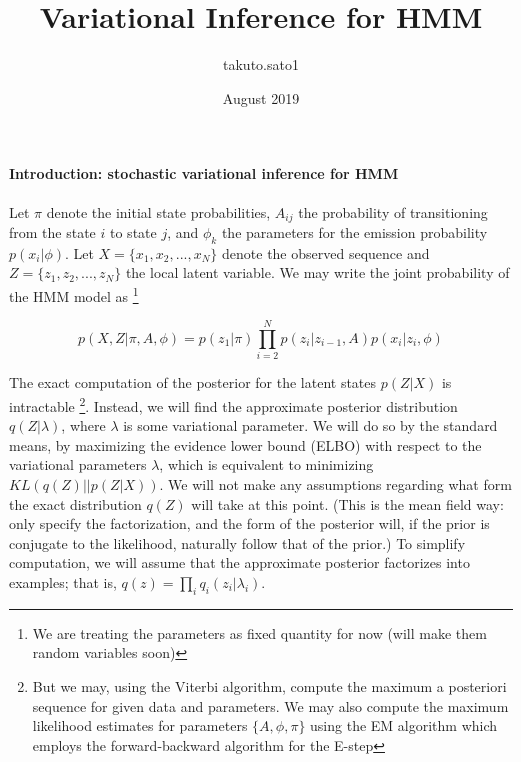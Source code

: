 \documentclass{article}
\title{Variational Inference for HMM}
\author{takuto.sato1 }
\date{August 2019}
\begin{document}
\maketitle

\paragraph{Introduction: stochastic variational inference for HMM}

Let $\pi$ denote the initial state probabilities, $A_{ij}$ the probability of transitioning from the state $i$ to state $j$, and $\phi_k$ the parameters for the emission probability $p(x_i|\phi)$. Let $X = \{x_1, x_2, ..., x_N \}$ denote the observed sequence and $Z = \{ z_1, z_2, ..., z_N \}$ the local latent variable. We may write the joint probability of the HMM model as
\footnote{We are treating the parameters as fixed quantity for now (will make them random variables soon)}

\begin{equation}
p(X,Z|\pi, A, \phi) = p(z_1 | \pi) \prod^N_{i = 2} p(z_i|z_{i-1}, A) p(x_i|z_i, \phi)
\end{equation}

The exact computation of the posterior for the latent states $p(Z|X)$ is intractable \footnote{But we may, using the Viterbi algorithm, compute the maximum a posteriori sequence for given data and parameters. We may also compute the maximum likelihood estimates for parameters $\{ A, \phi, \pi \}$ using the EM algorithm which employs the forward-backward algorithm for the E-step}. Instead, we will find the approximate posterior distribution $q(Z|\lambda)$, where $\lambda$ is some variational parameter. We will do so by the standard means, by maximizing the evidence lower bound (ELBO) with respect to the variational parameters $\lambda$, which is equivalent to minimizing $KL(q(Z)||p(Z|X))$. We will not make any assumptions regarding what form the exact distribution $q(Z)$ will take at this point. (This is the mean field way: only specify the factorization, and the form of the posterior will, if the prior is conjugate to the likelihood, naturally follow that of the prior.) To simplify computation,  we will assume that the approximate posterior factorizes into examples; that is, $q(z) = \prod_i q_i(z_i|\lambda_i)$.

\end{document}
